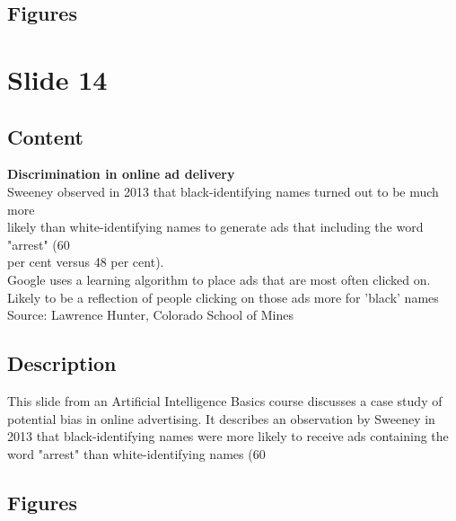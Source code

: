 \documentclass{article}%
\begin{document}
\subsection{Figures}%
\begin{figure}[H]%
\centering%
\end{figure}

%
\newpage%
\section{Slide 14}%
\label{sec:Slide14}%
\subsection{Content}%

\textbf{Discrimination in online ad delivery} \\
Sweeney observed in 2013 that black-identifying names turned out to be much more \\
likely than white-identifying names to generate ads that including the word "arrest" (60 \\
per cent versus 48 per cent). \\
Google uses a learning algorithm to place ads that are most often clicked on. \\
Likely to be a reflection of people clicking on those ads more for 'black' names \\
Source: Lawrence Hunter, Colorado School of Mines
%
\subsection{Description}%
This slide from an Artificial Intelligence Basics course discusses a case study of potential bias in online advertising.  It describes an observation by Sweeney in 2013 that black-identifying names were more likely to receive ads containing the word "arrest" than white-identifying names (60%
\subsection{Figures}%
\begin{figure}[H]%
\centering%
\end{figure}
\end{document}
